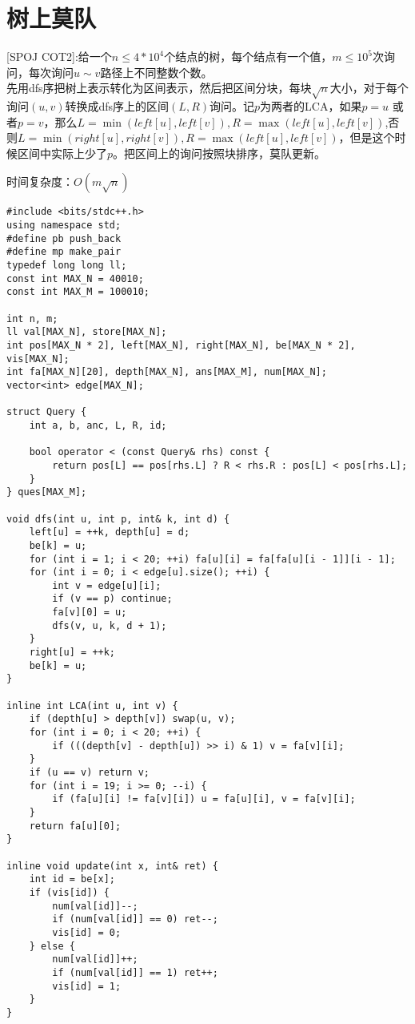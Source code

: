 \clearpage
\section{树上莫队}
[SPOJ COT2]:给一个$n\leq 4*10^4$个结点的树，每个结点有一个值，$m\leq 10^5$次询问，每次询问$u\sim v$路径上不同整数个数。 \\

先用dfs序把树上表示转化为区间表示，然后把区间分块，每块$\sqrt n$大小，对于每个询问$(u,v)$转换成dfs序上的区间$(L,R)$询问。记$p$为两者的LCA，如果$p=u$ 或者$p=v$，那么$L=\min (left[u], left[v]),R=\max (left[u], left[v])$,否则$L=\min (right[u], right[v]), R=\max (left[u], left[v])$，但是这个时候区间中实际上少了$p$。把区间上的询问按照块排序，莫队更新。

时间复杂度：$O(m\sqrt n)$
\begin{lstlisting}
#include <bits/stdc++.h>
using namespace std;
#define pb push_back
#define mp make_pair
typedef long long ll;
const int MAX_N = 40010;
const int MAX_M = 100010;

int n, m;
ll val[MAX_N], store[MAX_N];
int pos[MAX_N * 2], left[MAX_N], right[MAX_N], be[MAX_N * 2], vis[MAX_N];
int fa[MAX_N][20], depth[MAX_N], ans[MAX_M], num[MAX_N];
vector<int> edge[MAX_N];

struct Query {
    int a, b, anc, L, R, id;

    bool operator < (const Query& rhs) const {
        return pos[L] == pos[rhs.L] ? R < rhs.R : pos[L] < pos[rhs.L];
    }
} ques[MAX_M];

void dfs(int u, int p, int& k, int d) {
    left[u] = ++k, depth[u] = d;
    be[k] = u;
    for (int i = 1; i < 20; ++i) fa[u][i] = fa[fa[u][i - 1]][i - 1];
    for (int i = 0; i < edge[u].size(); ++i) {
        int v = edge[u][i];
        if (v == p) continue;
        fa[v][0] = u;
        dfs(v, u, k, d + 1);
    }
    right[u] = ++k;
    be[k] = u;
}

inline int LCA(int u, int v) {
    if (depth[u] > depth[v]) swap(u, v);
    for (int i = 0; i < 20; ++i) {
        if (((depth[v] - depth[u]) >> i) & 1) v = fa[v][i];
    }
    if (u == v) return v;
    for (int i = 19; i >= 0; --i) {
        if (fa[u][i] != fa[v][i]) u = fa[u][i], v = fa[v][i];
    }
    return fa[u][0];
}

inline void update(int x, int& ret) {
    int id = be[x];
    if (vis[id]) {
        num[val[id]]--;
        if (num[val[id]] == 0) ret--;
        vis[id] = 0;
    } else {
        num[val[id]]++;
        if (num[val[id]] == 1) ret++;
        vis[id] = 1;
    }
}


\end{lstlisting}
